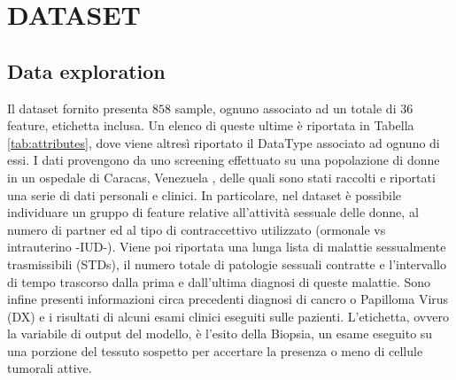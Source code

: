 \section{DATASET}
\subsection{Data exploration}
Il dataset fornito presenta $858$ sample, ognuno associato ad un totale di $36$ feature, etichetta inclusa. Un elenco di queste ultime è riportata in Tabella \ref{tab:attributes}, dove viene altresì riportato il DataType associato ad ognuno di essi. I dati provengono da uno screening effettuato su una popolazione di donne in un ospedale di Caracas, Venezuela \cite{ML}, delle quali sono stati raccolti e riportati una serie di dati personali e clinici. In particolare, nel dataset è possibile individuare un gruppo di feature relative all'attività sessuale delle donne, al numero di partner ed al tipo di contraccettivo utilizzato (ormonale vs intrauterino -IUD-). Viene poi riportata una lunga lista di malattie sessualmente trasmissibili (STDs), il numero totale di patologie sessuali contratte e l'intervallo di tempo trascorso dalla prima e dall'ultima diagnosi di queste malattie. Sono infine presenti informazioni circa precedenti diagnosi di cancro o Papilloma Virus (DX) e i risultati di alcuni esami clinici eseguiti sulle pazienti. L'etichetta, ovvero la variabile di output del modello, è l'esito della Biopsia, un esame eseguito su una porzione del tessuto sospetto per accertare la presenza o meno di cellule tumorali attive. 
